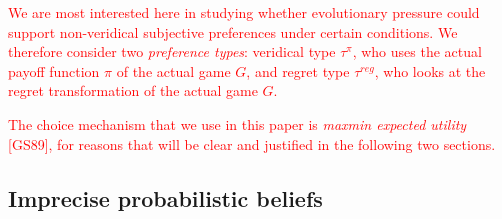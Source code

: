 \documentclass[fleqn,reqno,11pt]{article}
\begin{document}
\textcolor{red}{We are most interested here in studying whether evolutionary pressure could
  support non-veridical subjective preferences under certain conditions. We therefore consider
  two \emph{preference types}: veridical type $\tau^\pi$, who uses the actual payoff function
  $\pi$ of the actual game $G$, and regret type $\tau^{reg}$, who looks at the regret
  transformation of the actual game $G$.}

\textcolor{red}{The choice mechanism that we use in this paper is \textit{maxmin expected
    utility} [GS89], for reasons that will be clear and justified in the following two
  sections.  }



\subsection{Imprecise probabilistic beliefs}
\label{sec:impr-prob-beli}
\end{document}
